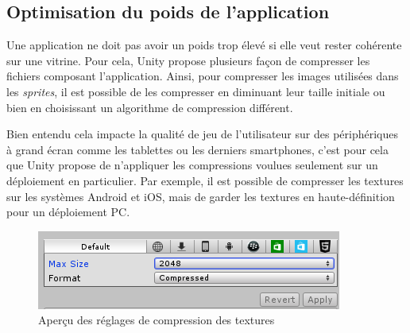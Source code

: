 \subsection{Optimisation du poids de l'application}

Une application ne doit pas avoir un poids trop élevé si elle veut rester cohérente sur une vitrine.  Pour cela, Unity propose plusieurs façon de compresser les fichiers composant l'application. Ainsi, pour compresser les images utilisées dans les \textit{sprites}, il est possible de les compresser en diminuant leur taille initiale ou bien en choisissant un algorithme de compression différent.

Bien entendu cela impacte la qualité de jeu de l'utilisateur sur des périphériques à grand écran comme les tablettes ou les derniers smartphones, c'est pour cela que Unity propose de n'appliquer les compressions voulues seulement sur un déploiement en particulier. Par exemple, il est possible de compresser les textures sur les systèmes Android et iOS, mais de garder les textures en haute-définition pour un déploiement PC.


\begin{figure}[H]\centering
  \includegraphics[scale=1]{./img/optimisation_poids.png}
  \caption{Aperçu des réglages de compression des textures}
  \label{optimisation_poids}
\end{figure}


